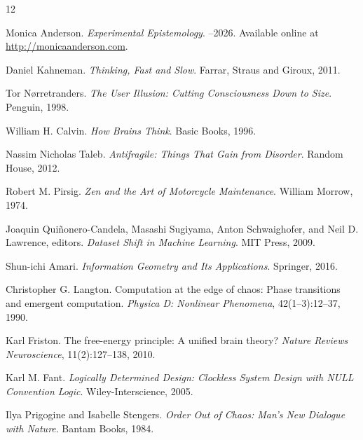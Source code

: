 \documentclass[11pt]{article}
\theoremstyle{remark}
\begin{document}
\begin{thebibliography}{12}

Monica Anderson.
\newblock \emph{Experimental Epistemology}.
--2026. Available online at \url{http://monicaanderson.com}.

Daniel Kahneman.
\newblock \emph{Thinking, Fast and Slow}.
\newblock Farrar, Straus and Giroux, 2011.

Tor N{\o}rretranders.
\newblock \emph{The User Illusion: Cutting Consciousness Down to Size}.
\newblock Penguin, 1998.

William H. Calvin.
\newblock \emph{How Brains Think}.
\newblock Basic Books, 1996.

Nassim Nicholas Taleb.
\newblock \emph{Antifragile: Things That Gain from Disorder}.
\newblock Random House, 2012.

Robert M. Pirsig.
\newblock \emph{Zen and the Art of Motorcycle Maintenance}.
\newblock William Morrow, 1974.

Joaquin Qui{\~n}onero-Candela, Masashi Sugiyama, Anton Schwaighofer, and Neil D. Lawrence, editors.
\newblock \emph{Dataset Shift in Machine Learning}.
\newblock MIT Press, 2009.

Shun-ichi Amari.
\newblock \emph{Information Geometry and Its Applications}.
\newblock Springer, 2016.

Christopher G. Langton.
\newblock Computation at the edge of chaos: Phase transitions and emergent computation.
\newblock \emph{Physica D: Nonlinear Phenomena}, 42(1--3):12--37, 1990.

Karl Friston.
\newblock The free-energy principle: A unified brain theory?
\newblock \emph{Nature Reviews Neuroscience}, 11(2):127--138, 2010.

Karl M. Fant.
\newblock \emph{Logically Determined Design: Clockless System Design with NULL Convention Logic}.
\newblock Wiley-Interscience, 2005.

Ilya Prigogine and Isabelle Stengers.
\newblock \emph{Order Out of Chaos: Man's New Dialogue with Nature}.
\newblock Bantam Books, 1984.

\end{thebibliography}
\end{document}
